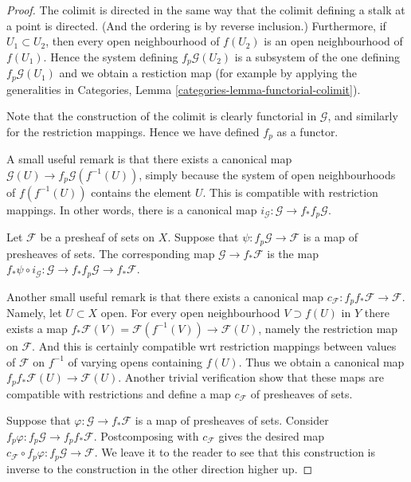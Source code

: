 \begin{proof}
The colimit is directed in the same way that the colimit
defining a stalk at a point is directed. (And the
ordering is by reverse inclusion.) Furthermore, if
$U_1 \subset U_2$, then every open neighbourhood of $f(U_2)$
is an open neighbourhood of $f(U_1)$. Hence the system defining
$f_p\mathcal{G}(U_2)$ is a subsystem of the one defining
$f_p\mathcal{G}(U_1)$ and we obtain a restiction map (for
example by applying the generalities in Categories,
Lemma \ref{categories-lemma-functorial-colimit}).

\medskip\noindent
Note that the construction of the colimit is clearly functorial
in $\mathcal{G}$, and similarly for the restriction mappings.
Hence we have defined $f_p$ as a functor.

\medskip\noindent
A small useful remark is that there exists
a canonical map $\mathcal{G}(U) \to f_p\mathcal{G}(f^{-1}(U))$,
simply because the system of open neighbourhoods
of $f(f^{-1}(U))$ contains the element $U$. This is compatible
with restriction mappings. In other words, there is a
canonical map $i_{\mathcal{G}} : \mathcal{G} \to f_* f_p \mathcal{G}$.

\medskip\noindent
Let $\mathcal{F}$ be a presheaf of sets on $X$.
Suppose that $\psi : f_p\mathcal{G} \to \mathcal{F}$
is a map of presheaves of sets. The corresponding map
$\mathcal{G} \to f_*\mathcal{F}$ is the map
$f_*\psi \circ i_{\mathcal{G}} :
\mathcal{G} \to f_* f_p \mathcal{G} \to f_* \mathcal{F}$.

\medskip\noindent
Another small useful remark is that there exists a
canonical map $c_{\mathcal{F}} : f_p f_* \mathcal{F} \to \mathcal{F}$.
Namely, let $U \subset X$ open. 
For every open neighbourhood $V \supset f(U)$ in $Y$
there exists a map
$f_*\mathcal{F}(V) = \mathcal{F}(f^{-1}(V))\to \mathcal{F}(U)$,
namely the restriction map on $\mathcal{F}$. And this is certainly
compatible wrt restriction mappings between values of $\mathcal{F}$
on $f^{-1}$ of varying opens containing $f(U)$. Thus we obtain
a canonical map $f_p f_* \mathcal{F}(U) \to \mathcal{F}(U)$.
Another trivial verification show that these maps are compatible
with restrictions and define a map $c_{\mathcal{F}}$
of presheaves of sets.

\medskip\noindent
Suppose that $\varphi : \mathcal{G} \to f_*\mathcal{F}$
is a map of presheaves of sets. Consider $f_p\varphi :
f_p \mathcal{G} \to f_p f_* \mathcal{F}$. 
Postcomposing with $c_{\mathcal{F}}$ gives the desired map
$c_{\mathcal{F}} \circ f_p\varphi : f_p\mathcal{G} \to \mathcal{F}$.
We leave it to the reader to see that this construction is inverse
to the construction in the other direction higher up.
\end{proof}

